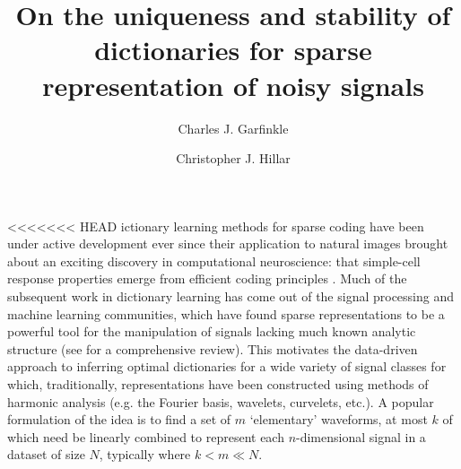 \documentclass[9pt,twocolumn]{pnas-new}
\title{On the uniqueness and stability of dictionaries for sparse representation of noisy signals}
\author[a,1]{Charles J. Garfinkle}
\author[a,1]{Christopher J. Hillar}
\affil[a]{Redwood Center for Theoretical Neuroscience, Berkeley, CA, USA}
\begin{document}
\verticaladjustment{-2pt}

\maketitle
\thispagestyle{firststyle}

<<<<<<< HEAD
ictionary learning methods for sparse coding have been under active development ever since their application to natural images brought about an exciting discovery in computational neuroscience: that simple-cell response properties emerge from efficient coding principles \cite{Olshausen96, hurri1996image, bell1997independent, van1998independent}. Much of the subsequent work in dictionary learning has come out of the signal processing and machine learning communities, which have found sparse representations to be a powerful tool for the manipulation of signals lacking much known analytic structure (see \cite{Zhang15} for a comprehensive review). This motivates the data-driven approach to inferring optimal dictionaries for a wide variety of signal classes for which, traditionally, representations have been constructed using methods of harmonic analysis (e.g. the Fourier basis, wavelets, curvelets, etc.). A popular formulation of the idea is to find a set of $m$ `elementary' waveforms, at most $k$ of which need be linearly combined to represent each $n$-dimensional signal in a dataset of size $N$, typically where $k < m \ll N$. 
\end{document}
